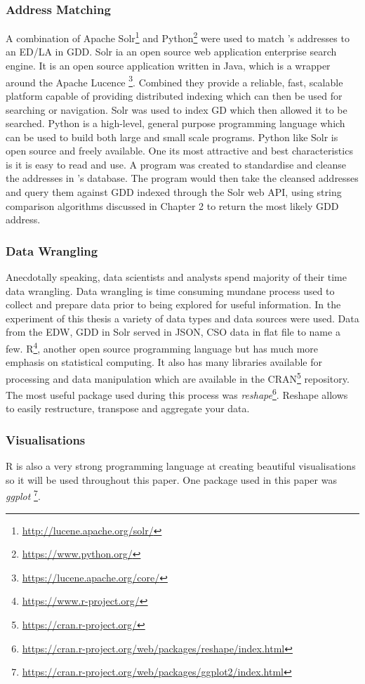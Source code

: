 \subsubsection{Address Matching}
A combination of Apache Solr\footnote{\url{http://lucene.apache.org/solr/}} and Python\footnote{\url{https://www.python.org/}} were used to match \subjectname's addresses to an ED/LA in GDD. Solr ia an open source web application enterprise search engine. It is an open source application written in Java, which is a wrapper around the Apache Lucence \footnote{{\url{https://lucene.apache.org/core/}}}. Combined they provide a reliable, fast, scalable platform capable of providing distributed indexing which can then be used for searching or navigation. Solr was used to index GD which then allowed it to be searched. Python is a high-level, general purpose programming language which can be used to build both large and small scale programs. Python like Solr is open source and freely available. One its most attractive and best characteristics is it is easy to read and use. A program was created to standardise and cleanse the addresses in \subjectname's database. The program would then take the cleansed addresses and query them against GDD indexed through the Solr web API, using string comparison algorithms discussed in Chapter 2 to return the most likely GDD address.

\subsubsection{Data Wrangling}
Anecdotally speaking, data scientists and analysts spend majority of their time data wrangling. Data wrangling is time consuming mundane process used to collect and prepare data prior to being explored for useful information. In the experiment of this thesis a variety of data types and data sources were used. Data from the \subjectname EDW, GDD in Solr served in JSON, CSO data in flat file to name a few. R\footnote{{\url{https://www.r-project.org/}}}, another open source programming language but has much more emphasis on statistical computing. It also has many libraries available for processing and data manipulation which are available in the CRAN\footnote{{\url{https://cran.r-project.org/}}} repository. The most useful package used during this process was \textit{reshape}\footnote{{\url{https://cran.r-project.org/web/packages/reshape/index.html}}}. Reshape allows to easily restructure, transpose and aggregate your data. 

\subsubsection{Visualisations}
R is also a very strong programming language at creating beautiful visualisations so it will be used throughout this paper. One package used in this paper was \textit{ggplot}
\footnote{{\url{https://cran.r-project.org/web/packages/ggplot2/index.html}}}. 

